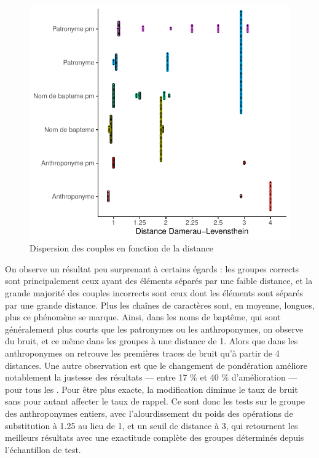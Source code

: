 \begin{figure}[ht] %
    \centering
    \includegraphics[scale=1.2]{3.Results/Img/Dotplot.pdf}
    \caption{Dispersion des couples en fonction de la distance}
    \label{graph_dispertion_cluster}
\end{figure}

On observe un résultat peu surprenant à certains égards : les groupes corrects sont principalement ceux ayant des éléments séparés par une faible distance, et la grande majorité des couples incorrects sont ceux dont les éléments sont séparés par une grande distance. 
Plus les chaînes de caractères sont, en moyenne, longues, plus ce phénomène se marque.
Ainsi, dans les noms de baptême, qui sont généralement plus courts que les patronymes ou les anthroponymes, on observe du bruit, et ce même dans les groupes à une distance de 1. Alors que dans les anthroponymes on retrouve les premières traces de bruit qu’à partir de 4 distances.
Une autre observation est que le changement de pondération améliore notablement la justesse des résultats --- entre 17 \% et 40 \% d'amélioration  --- pour tous les . Pour être plus exacte, la modification diminue le taux de bruit sans pour autant affecter le taux de rappel.
Ce sont donc les tests sur le groupe des anthroponymes entiers, avec l'alourdissement du poids des opérations de substitution à 1.25 au lieu de 1, et un seuil de distance à 3, qui retournent les meilleurs résultats avec une exactitude complète des groupes déterminés depuis l'échantillon de test.

